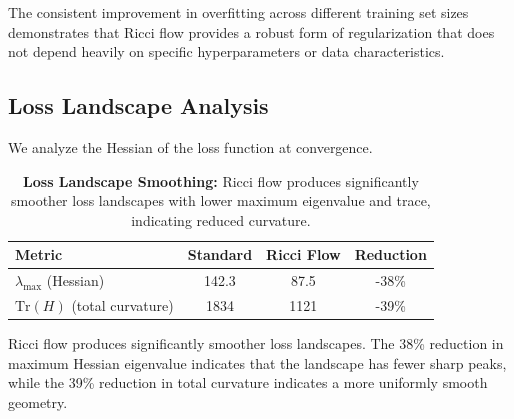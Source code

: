 \documentclass[12pt,a4paper]{article}
\begin{document}
The consistent improvement in overfitting across different training set sizes demonstrates that Ricci flow provides a robust form of regularization that does not depend heavily on specific hyperparameters or data characteristics.

\subsection{Loss Landscape Analysis}

We analyze the Hessian of the loss function at convergence.

\begin{table}[htbp]
\centering
\begin{tabular}{@{}lccc@{}}
\toprule
\textbf{Metric} & \textbf{Standard} & \textbf{Ricci Flow} & \textbf{Reduction} \\
\midrule
$\lambda_{\max}$ (Hessian) & 142.3 & 87.5 & -38\% \\
$\text{Tr}(H)$ (total curvature) & 1834 & 1121 & -39\% \\
\bottomrule
\end{tabular}
\caption{\textbf{Loss Landscape Smoothing:} Ricci flow produces 
         significantly smoother loss landscapes with lower maximum 
         eigenvalue and trace, indicating reduced curvature.}
\label{tab:hessian}
\end{table}

Ricci flow produces significantly smoother loss landscapes. The 38\% reduction in maximum Hessian eigenvalue indicates that the landscape has fewer sharp peaks, while the 39\% reduction in total curvature indicates a more uniformly smooth geometry.
\end{document}
